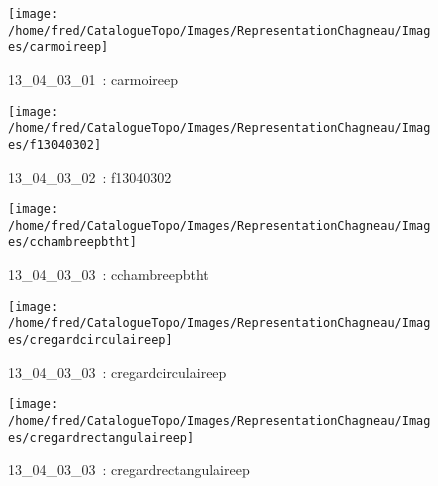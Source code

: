 \documentclass[12pt,titlepage]{book}
\begin{document}
\begin{figure}[h!]
  \hfill         %
  \begin{minipage}[t]{3cm}
    \begin{center}
      \texttt{[image: /home/fred/CatalogueTopo/Images/RepresentationChagneau/Images/carmoireep]}
      \caption[~13\_04\_03\_01]{\small{13\_04\_03\_01~:} \tiny{carmoireep}}\label{carmoireep}
    \end{center}
  \end{minipage}
  \begin{minipage}[t]{3cm}
    \begin{center}
      \texttt{[image: /home/fred/CatalogueTopo/Images/RepresentationChagneau/Images/f13040302]}
      \caption[~13\_04\_03\_02]{\small{13\_04\_03\_02~:} \tiny{f13040302}}\label{f13040302}
    \end{center}
  \end{minipage}
  \begin{minipage}[t]{3cm}
    \begin{center}
      \texttt{[image: /home/fred/CatalogueTopo/Images/RepresentationChagneau/Images/cchambreepbtht]}
      \caption[~13\_04\_03\_03]{\small{13\_04\_03\_03~:} \tiny{cchambreepbtht}}\label{cchambreepbtht}
    \end{center}
  \end{minipage}
  \begin{minipage}[t]{3cm}
    \begin{center}
      \texttt{[image: /home/fred/CatalogueTopo/Images/RepresentationChagneau/Images/cregardcirculaireep]}
      \caption[~13\_04\_03\_03]{\small{13\_04\_03\_03~:} \tiny{cregardcirculaireep}}\label{cregardcirculaireep}
    \end{center}
  \end{minipage}
  \begin{minipage}[t]{3cm}
    \begin{center}
      \texttt{[image: /home/fred/CatalogueTopo/Images/RepresentationChagneau/Images/cregardrectangulaireep]}
      \caption[~13\_04\_03\_03]{\small{13\_04\_03\_03~:} \tiny{cregardrectangulaireep}}\label{cregardrectangulaireep}
    \end{center}
  \end{minipage}

\end{figure}
\end{document}
